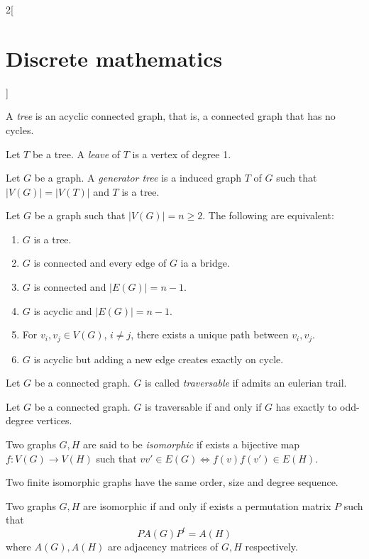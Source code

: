 \documentclass[class=article,10pt,crop=false]{standalone}
\begin{document}
\begin{multicols}{2}[\section{Discrete mathematics}]
\begin{prop}
\begin{enumerate}
\end{enumerate}
\end{prop}
\begin{definition}
A \textit{tree} is an acyclic connected graph, that is, a connected graph that has no cycles.
\end{definition}
\begin{definition}
Let $T$ be a tree. A \textit{leave} of $T$ is a vertex of degree 1.
\end{definition}
\begin{definition}
Let $G$ be a graph. A \textit{generator tree} is a induced graph $T$ of $G$ such that $|V(G)|=|V(T)|$ and $T$ is a tree.
\end{definition}
\begin{prop}
Let $G$ be a graph such that $|V(G)|=n\geq 2$. The following are equivalent:
\begin{enumerate}
    \item $G$ is a tree.
    \item $G$ is connected and every edge of $G$ ia a bridge.
    \item $G$ is connected and $|E(G)|=n-1$.
    \item $G$ is acyclic and $|E(G)|=n-1$.
    \item For $v_i,v_j\in V(G)$, $i\ne j$, there exists a unique path between $v_i,v_j$. 
    \item $G$ is acyclic but adding a new edge creates exactly on cycle.
\end{enumerate}
\end{prop}
\begin{definition}
Let $G$ be a connected graph. $G$ is called \textit{traversable} if admits an eulerian trail.
\end{definition}
\begin{theorem}
Let $G$ be a connected graph. $G$ is traversable if and only if $G$ has exactly to odd-degree vertices.
\end{theorem}
\begin{definition}
Two graphs $G,H$ are said to be \textit{isomorphic} if exists a bijective map $f:V(G)\rightarrow V(H)$ such that $vv'\in E(G)\iff f(v)f(v')\in E(H)$.
\end{definition}
\begin{prop}
Two finite isomorphic graphs have the same order, size and degree sequence.
\end{prop}
\begin{theorem}
Two graphs $G,H$ are isomorphic if and only if exists a permutation matrix $P$ such that $$PA(G)P^t=A(H)$$ where $A(G),A(H)$ are adjacency matrices of $G,H$ respectively.
\end{theorem}

\end{multicols}
\end{document}
